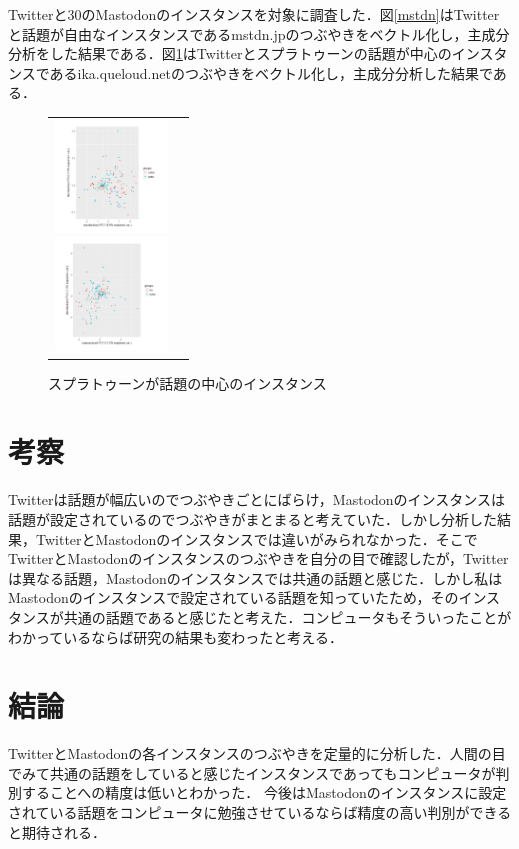 \documentclass[uplatex,twocolumn,dvipdfmx]{jsarticle}
\begin{document}
Twitterと30のMastodonのインスタンスを対象に調査した．図\ref{mstdn}はTwitterと話題が自由なインスタンスであるmstdn.jpのつぶやきをベクトル化し，主成分分析をした結果である．図\ref{ika}はTwitterとスプラトゥーンの話題が中心のインスタンスであるika.queloud.netのつぶやきをベクトル化し，主成分分析した結果である．
\vspace{-1.5zh}
\begin{figure}[h]
\begin{tabular}{cc}
\begin{minipage}{0.5\hsize}
\begin{center}
\includegraphics[width=30mm,clip]{mstdn.pdf}
\caption{話題が自由なインスタンス}
\label{mstdn}
\end{center}
\end{minipage}
\begin{minipage}{0.5\hsize}
\begin{center}
\includegraphics[width=30mm,clip]{ika.pdf}
\caption{スプラトゥーンが話題の中心のインスタンス}
\label{ika}
\end{center} 
\end{minipage}
\end{tabular}
\end{figure}
\vspace{-2.5zh}
\section{考察}

Twitterは話題が幅広いのでつぶやきごとにばらけ，Mastodonのインスタンスは話題が設定されているのでつぶやきがまとまると考えていた．しかし分析した結果，TwitterとMastodonのインスタンスでは違いがみられなかった．そこでTwitterとMastodonのインスタンスのつぶやきを自分の目で確認したが，Twitterは異なる話題，Mastodonのインスタンスでは共通の話題と感じた．しかし私はMastodonのインスタンスで設定されている話題を知っていたため，そのインスタンスが共通の話題であると感じたと考えた．コンピュータもそういったことがわかっているならば研究の結果も変わったと考える．


\section{結論}

TwitterとMastodonの各インスタンスのつぶやきを定量的に分析した．人間の目でみて共通の話題をしていると感じたインスタンスであってもコンピュータが判別することへの精度は低いとわかった．
今後はMastodonのインスタンスに設定されている話題をコンピュータに勉強させているならば精度の高い判別ができると期待される．


\end{document}
